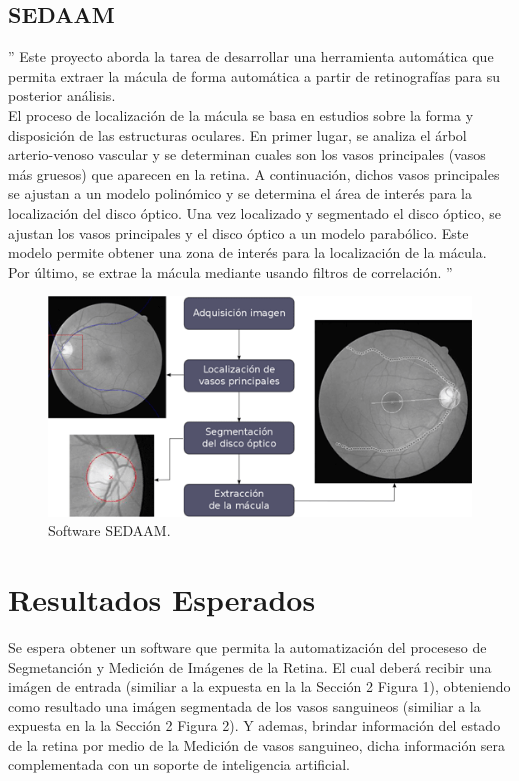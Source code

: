 \documentclass[14pt]{article}
\begin{document}
\subsection{SEDAAM}
'' Este proyecto aborda la tarea de desarrollar una herramienta automática que permita extraer la mácula de forma automática a partir de retinografías para su posterior análisis.\\

El proceso de localización de la mácula se basa en estudios sobre la forma y disposición de las estructuras oculares. En primer lugar, se analiza el árbol arterio-venoso vascular y se determinan cuales son los vasos principales (vasos más gruesos) que aparecen en la retina. A continuación, dichos vasos principales se ajustan a un modelo polinómico y se determina el área de interés para la localización del disco óptico. Una vez localizado y segmentado el disco óptico, se ajustan los vasos principales y el disco óptico a un modelo parabólico. Este modelo permite obtener una zona de interés para la localización de la mácula. Por último, se extrae la mácula mediante usando filtros de correlación. '' \cite{Sedaam}

\begin{figure}[h]
	\begin{center}
		\includegraphics[scale=.5]{./Imagenes/esquema_sirius.png}
		\caption{Software SEDAAM.}
	\end{center}
\end{figure} 





\section{Resultados Esperados}

Se espera obtener un software que permita la automatización del proceseso de Segmetanción y Medición de Imágenes de la Retina. El cual deberá recibir una imágen de entrada (similiar a la expuesta en la la Sección 2 Figura 1), obteniendo como resultado una imágen segmentada de los vasos sanguineos (similiar a la expuesta en la la Sección 2 Figura 2). Y ademas, brindar información del estado de la retina por medio de la Medición de vasos sanguineo, dicha información sera complementada con un soporte de inteligencia artificial. 
\end{document}
